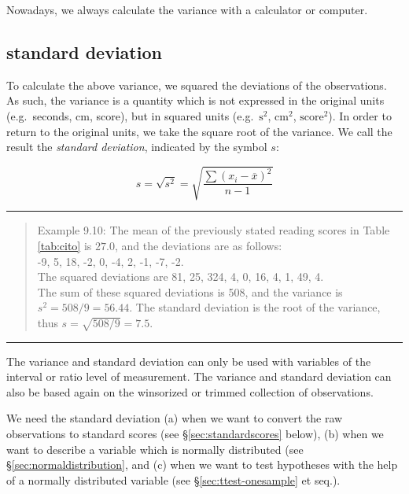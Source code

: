 \documentclass[
]{book}
\begin{document}
Nowadays, we always calculate the variance with a calculator
or computer.

\hypertarget{sec:standarddeviation}{%
\subsection{standard deviation}\label{sec:standarddeviation}}

To calculate the above variance, we squared the deviations of the
observations. As such, the variance is a quantity which is not expressed
in the original units (e.g.~seconds, cm, score),
but in squared units (e.g.~\(\textrm{s}^2\),
\(\textrm{cm}^2\), \(\textrm{score}^2\)). In order to return to the
original units, we take the square root of the variance. We call the result the
\emph{standard deviation}, indicated by the symbol \(s\):

\begin{equation}
  s = \sqrt{s^2} = \sqrt{ \frac{ \sum (x_i - \overline{x})^2 } {n-1} }
  \label{eq:standarddeviation}
\end{equation}

\begin{center}\rule{0.5\linewidth}{0.5pt}\end{center}

\begin{quote}
Example 9.10:
The mean of the previously stated reading scores in
Table \ref{tab:cito} is
\(27.0\), and the deviations are as follows:\\
-9, 5, 18, -2, 0, -4, 2, -1, -7, -2.\\
The squared deviations are 81, 25, 324, 4, 0, 16, 4, 1, 49, 4.\\
The sum of these squared deviations is 508, and the variance is
\(s^2=508/9=56.44\). The standard deviation is the root of the
variance, thus \(s=\sqrt{508/9}=7.5\).
\end{quote}

\begin{center}\rule{0.5\linewidth}{0.5pt}\end{center}

The variance and standard deviation can only be used with variables
of the interval or ratio level of measurement. The variance and
standard deviation can also be based again on the winsorized or trimmed
collection of observations.

We need the standard deviation
(a) when we want to convert the raw
observations to standard scores (see §\ref{sec:standardscores} below),
(b) when we want to describe a variable
which is normally distributed (see §\ref{sec:normaldistribution}, and
(c) when we want to test hypotheses with the help of a normally distributed variable (see
§\ref{sec:ttest-onesample} et seq.).
\end{document}
